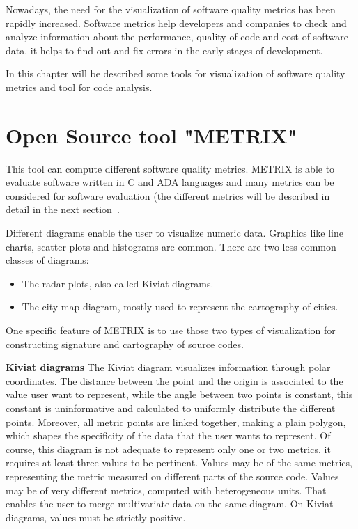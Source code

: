 Nowadays, the need for the visualization of software quality metrics has been rapidly increased. Software metrics help developers and companies to check and analyze information about the performance, quality of code and cost of software data. it helps to find out and fix errors in the early stages of development.

In this chapter will be described some tools for visualization of software quality metrics and tool for code analysis.

\section{Open Source tool "METRIX"}

This tool can compute different software quality metrics. METRIX is able to evaluate software written in C and ADA languages and many metrics can be considered for software evaluation (the different metrics will be described in detail in the next section~\cite{metrix}. 

Different diagrams enable the user to visualize numeric data. Graphics like line charts, scatter plots and histograms are common. 
There are two less-common classes of diagrams: 
\begin{itemize}
	\item The radar plots, also called Kiviat diagrams.
	\item The city map diagram, mostly used to represent the cartography of cities.
\end{itemize}
One specific feature of METRIX is to use those two types of visualization for constructing signature and cartography of source codes.
 
\textbf{Kiviat diagrams}
The Kiviat diagram visualizes information through polar coordinates. The distance between the point and the origin is associated to the value user want to represent, while the angle between two points is constant, this constant is uninformative and calculated to uniformly distribute the different points. Moreover, all metric points are linked together, making a plain polygon, which shapes the specificity of the data that the user wants to represent. Of course, this diagram is not adequate to represent only one or two metrics, it requires at least three values to be pertinent. Values may be of the same metrics, representing the metric measured on different parts of the source code. Values may be of very different metrics, computed  with heterogeneous units. That enables the user to merge multivariate data on the same diagram. On Kiviat diagrams, values must be strictly positive. 

